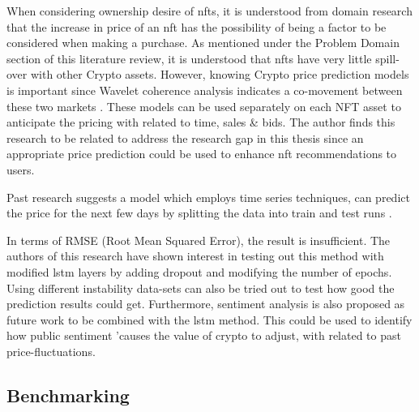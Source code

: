 \bigbreak

When considering ownership desire of \gls{nft}s, it is understood from domain research that the increase in price of an \gls{nft} has the possibility of being a factor to be considered when making a purchase.
As mentioned under the Problem Domain section of this literature review, it is understood that \gls{nft}s have very little spill-over with other Crypto assets. However, knowing Crypto price prediction models is important since Wavelet coherence analysis indicates a co-movement between these two markets \autocite{dowling_is_2021}.
These models can be used separately on each NFT asset to anticipate the pricing with related to time, sales \& bids.
The author finds this research to be related to address the research gap in this thesis since an appropriate price prediction could be used to enhance \Gls{nft}  recommendations to users.

Past research suggests a model which employs time series techniques, can predict the price for the next few days by splitting the data into train and test runs \autocite{ferdiansyah_lstm-method_2019}.

In terms of RMSE (Root Mean Squared Error), the result is insufficient. The authors of this research have shown interest in testing out this method with modified \gls{lstm} layers by adding dropout and modifying the number of epochs. Using different instability data-sets can also be tried out to test how good the prediction results could get. 
Furthermore, sentiment analysis is also proposed as future work to be combined with the \gls{lstm} method. This could be used to identify how public sentiment 'causes the value of crypto to adjust, with related to past price-fluctuations.


\subsection{Benchmarking}








